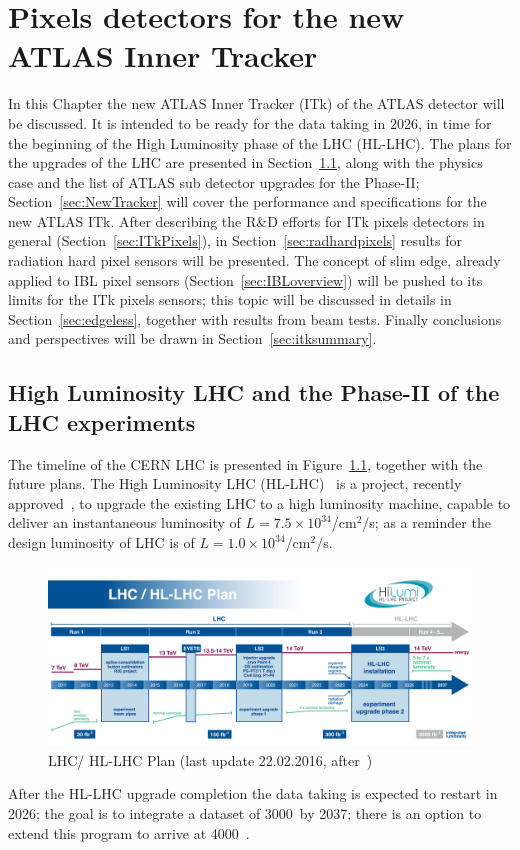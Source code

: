\chapter{Pixels detectors for the new ATLAS Inner Tracker}
\label{chap:ITk}

In this Chapter the new ATLAS Inner Tracker (ITk) of the ATLAS detector will be discussed. It is intended to be ready 
for  the data taking in 2026, in time for the beginning of the High Luminosity phase of the LHC (HL-LHC). 
The plans for the upgrades of the LHC are presented in Section~\ref{sec:HL-LHC}, along with the 
physics case and the list of ATLAS sub detector upgrades for the Phase-II; 
Section~\ref{sec:NewTracker} will cover the performance and specifications for the new ATLAS ITk. 
After describing the R\&D efforts for ITk pixels detectors in general (Section~\ref{sec:ITkPixels}), 
in Section~\ref{sec:radhardpixels} results for radiation hard pixel sensors will be presented. 
The concept of slim edge, already applied to IBL pixel sensors (Section~\ref{sec:IBLoverview}) will be 
pushed to its limits for the ITk pixels sensors; this topic will be discussed in details in 
Section~\ref{sec:edgeless}, together with results from beam tests. 
Finally conclusions and perspectives will be drawn in Section~\ref{sec:itksummary}.



\section{High Luminosity LHC and the Phase-II of the LHC experiments}
\label{sec:HL-LHC}

The timeline of the CERN LHC is presented in Figure~\ref{fig:HL-LHC-plan-2016-01}, together 
with the future plans. The High Luminosity LHC (HL-LHC)~\cite{HL_LHC} is a project, recently 
approved~\cite{HL-LHCApproval},  to upgrade the existing LHC to a high luminosity machine, 
capable to deliver an instantaneous luminosity of $L=7.5\times10^{34}$/cm$^{2}$/s; as a 
reminder the design luminosity of LHC is of $L=1.0\times10^{34}$/cm$^{2}$/s.
\begin{figure}[!htpb]
\centering
\includegraphics[width=1.0\textwidth]{HL-LHC-plan-2016-01.png}
\caption{\label{fig:HL-LHC-plan-2016-01}LHC/ HL-LHC Plan (last update 22.02.2016, after~\cite{HL_LHC})}
\end{figure}
After the HL-LHC upgrade completion the data taking  is expected to restart in 2026; the goal 
is to integrate a dataset of 3000~\invfb by 2037; there is an option to extend this program to arrive 
at 4000~\invfb.

